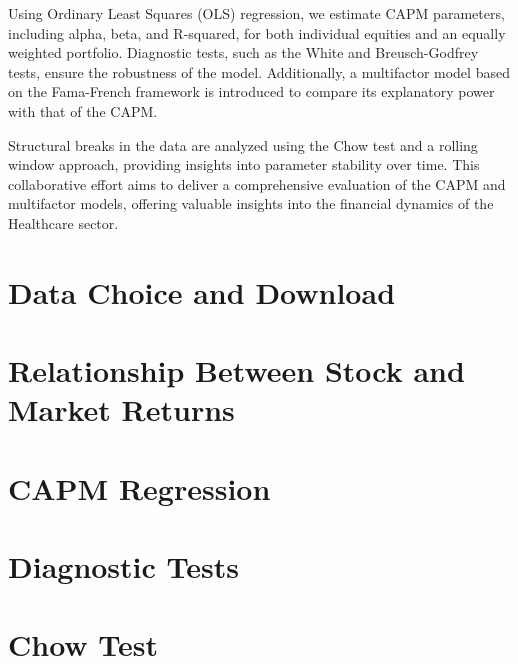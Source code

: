 \documentclass[12pt, openright, oneside]{report}
\begin{document}
Using Ordinary Least Squares (OLS) regression, we estimate CAPM parameters, including alpha, beta, and R-squared, for both 
individual equities and an equally weighted portfolio. Diagnostic tests, such as the White and Breusch-Godfrey tests, ensure 
the robustness of the model. Additionally, a multifactor model based on the Fama-French framework is introduced to compare its
explanatory power with that of the CAPM.

Structural breaks in the data are analyzed using the Chow test and a rolling window approach, providing insights into 
parameter stability over time. This collaborative effort aims to deliver a comprehensive evaluation of the CAPM and 
multifactor models, offering valuable insights into the financial dynamics of the Healthcare sector.
\chapter{Data Choice and Download}
\label{chapter:download}

\chapter{Relationship Between Stock and Market Returns}\label{chapter:equity_returns}


\chapter{CAPM Regression}\label{chapter:linear_regression}


\chapter{Diagnostic Tests}\label{chapter:diagnostic_tests}


\chapter{Chow Test}\label{chapter:chow_test}

\end{document}
